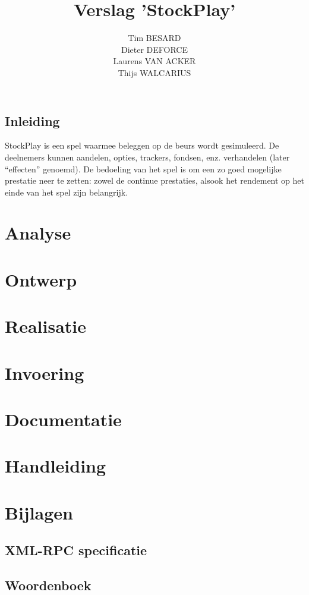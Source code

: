 \documentclass[a4paper,oneside]{report}
\title{Verslag 'StockPlay'}
\author{
Tim BESARD\\
Dieter DEFORCE\\
Laurens VAN ACKER\\
Thijs WALCARIUS
}
\begin{document}
\maketitle
{}
\tableofcontents
{}


%
%

\chapter*{Inleiding}
StockPlay is een spel waarmee beleggen op de beurs wordt gesimuleerd. De deelnemers kunnen aandelen, opties, trackers, fondsen, enz. verhandelen (later ``effecten'' genoemd). De bedoeling van het spel is om een zo goed mogelijke prestatie neer te zetten: zowel de continue prestaties, alsook het rendement op het einde van het spel zijn belangrijk.

\part{Analyse}


\part{Ontwerp}


\part{Realisatie}


\part{Invoering}


\part{Documentatie}


\part{Handleiding}


%
%

\part{Bijlagen}
\appendix

\chapter{XML-RPC specificatie}


\chapter{Woordenboek}


\printindex
\end{document}
